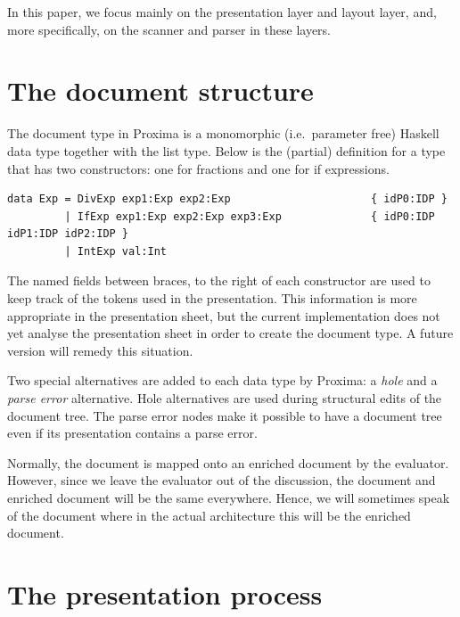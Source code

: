 \documentclass[12pt]{article}
\begin{document}
In this paper, we focus mainly on the presentation layer and layout layer, and, more specifically, on the scanner and parser in these layers.




%
\section{The document structure}\label{sect:document}
%

The document type in Proxima is a monomorphic (i.e.\ parameter free) Haskell data type together with the list type. Below is the (partial) definition for a type  that has two constructors: one for fractions and one for if expressions. 


\begin{footnotesize}
\begin{verbatim}
data Exp = DivExp exp1:Exp exp2:Exp                      { idP0:IDP }
         | IfExp exp1:Exp exp2:Exp exp3:Exp              { idP0:IDP idP1:IDP idP2:IDP }
         | IntExp val:Int
\end{verbatim}
\end{footnotesize}

The named fields between braces, to the right of each constructor are used to keep track of the tokens used in the presentation. This information is more appropriate in the presentation sheet, but the current implementation does not yet analyse the presentation sheet in order to create the document type. A future version will remedy this situation.

Two special alternatives are added to each data type by Proxima: a {\em hole} and a {\em parse error} alternative. Hole alternatives are used during structural edits of the document tree. The parse error nodes make it possible to have a document tree even if its presentation contains a parse error.

Normally, the document is mapped onto an enriched document by the evaluator. However, since we leave the evaluator out of the discussion, the document and enriched document will be the same everywhere. Hence, we will sometimes speak of the document where in the actual architecture this will be the enriched document.






%
\section{The presentation process}\label{sect:presentationProcess}
%
\end{document}
